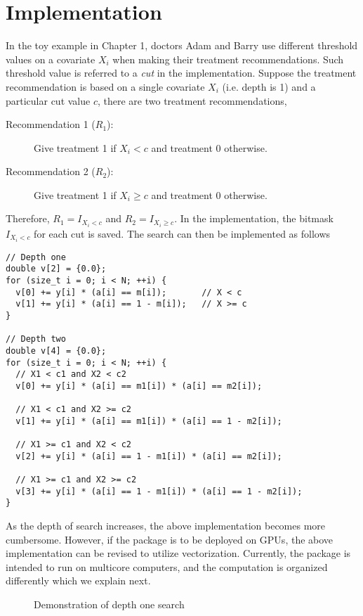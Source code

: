 \chapter{Implementation}

In the toy example in Chapter 1, doctors Adam and Barry use different threshold
values on a covariate $X_i$ when making their treatment recommendations. Such
threshold value is referred to a {\it cut} in the implementation. Suppose the treatment recommendation is based on a single 
covariate $X_i$ (i.e. depth is 1) and a particular cut value $c$, there are two treatment
recommendations, 
\begin{description}
\item[Recommendation 1 ($R_1$):] Give treatment 1 if $X_i < c$ and treatment 0 otherwise.
\item[Recommendation 2 ($R_2$):] Give treatment 1 if $X_i \geq c$ and treatment 0 otherwise. 
\end{description}
Therefore,   $R_1=I_{X_i < c}$ and
$R_2=I_{X_i \geq c}$. In the implementation, the bitmask $I_{X_i<c}$
for each cut is saved.  The  search can then be implemented as follows

\begin{verbatim}
// Depth one 
double v[2] = {0.0}; 
for (size_t i = 0; i < N; ++i) {
  v[0] += y[i] * (a[i] == m[i]);       // X < c
  v[1] += y[i] * (a[i] == 1 - m[i]);   // X >= c
}

// Depth two 
double v[4] = {0.0}; 
for (size_t i = 0; i < N; ++i) {
  // X1 < c1 and X2 < c2
  v[0] += y[i] * (a[i] == m1[i]) * (a[i] == m2[i]); 
  
  // X1 < c1 and X2 >= c2
  v[1] += y[i] * (a[i] == m1[i]) * (a[i] == 1 - m2[i]);

  // X1 >= c1 and X2 < c2
  v[2] += y[i] * (a[i] == 1 - m1[i]) * (a[i] == m2[i]);

  // X1 >= c1 and X2 >= c2 
  v[3] += y[i] * (a[i] == 1 - m1[i]) * (a[i] == 1 - m2[i]);
}
\end{verbatim}

As the depth of search increases, the above implementation becomes
more cumbersome. However, if the package is to be deployed on GPUs,
the above implementation can be revised to utilize vectorization.
Currently, the package is intended to run on multicore computers, and the
computation is organized differently which we explain next.

\begin{figure}[h]
  \centering
  \caption{Demonstration of depth one search}
  \label{fig:depth1}
\end{figure}

